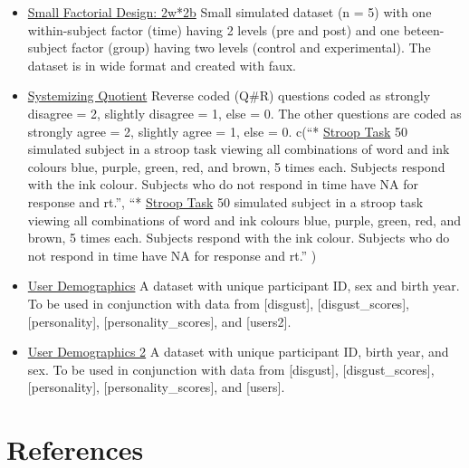\documentclass[
  oneside]{book}
\begin{document}
\begin{itemize}
\item
  \href{data/smalldata.csv}{Small Factorial Design: 2w*2b} Small simulated dataset (n = 5) with one within-subject factor (time) having 2 levels (pre and post) and one beteen-subject factor (group) having two levels (control and experimental). The dataset is in wide format and created with faux.
\item
  \href{data/sq_data.csv}{Systemizing Quotient} Reverse coded (Q\#R) questions coded as strongly disagree = 2, slightly disagree = 1, else = 0. The other questions are coded as strongly agree = 2, slightly agree = 1, else = 0.
  c(``* \href{data/stroop.csv}{Stroop Task} 50 simulated subject in a stroop task viewing all combinations of word and ink colours blue, purple, green, red, and brown, 5 times each. Subjects respond with the ink colour. Subjects who do not respond in time have NA for response and rt.'', ``* \href{data/stroop.xlsx}{Stroop Task} 50 simulated subject in a stroop task viewing all combinations of word and ink colours blue, purple, green, red, and brown, 5 times each. Subjects respond with the ink colour. Subjects who do not respond in time have NA for response and rt.''
  )
\item
  \href{data/users.csv}{User Demographics} A dataset with unique participant ID, sex and birth year. To be used in conjunction with data from {[}disgust{]}, {[}disgust\_scores{]}, {[}personality{]}, {[}personality\_scores{]}, and {[}users2{]}.
\item
  \href{data/users2.csv}{User Demographics 2} A dataset with unique participant ID, birth year, and sex. To be used in conjunction with data from {[}disgust{]}, {[}disgust\_scores{]}, {[}personality{]}, {[}personality\_scores{]}, and {[}users{]}.
\end{itemize}

\hypertarget{bookrefs}{%
\chapter{References}\label{bookrefs}}

  
\end{document}
